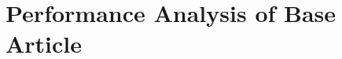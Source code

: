 \documentclass{article}
\begin{document}
\section {Performance Analysis of Base Article}
\end{document}
